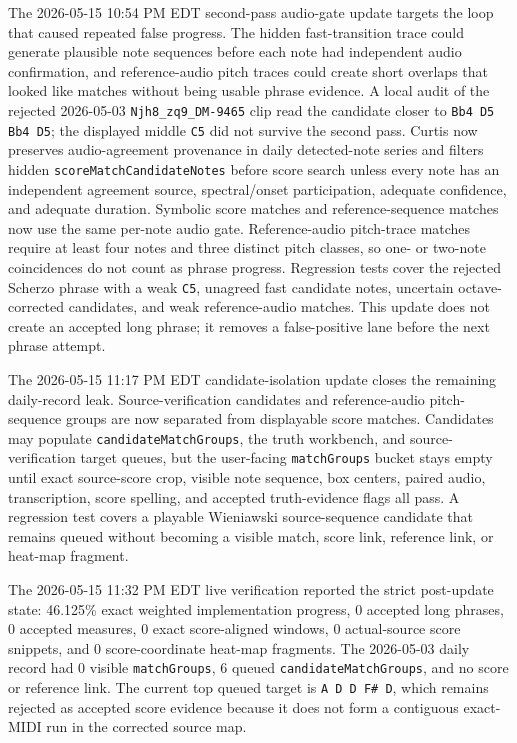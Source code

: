 \documentclass[12pt,letterpaper]{article}
\begin{document}
The 2026-05-15 10:54 PM EDT second-pass audio-gate update targets the loop that caused repeated false progress. The hidden fast-transition trace could generate plausible note sequences before each note had independent audio confirmation, and reference-audio pitch traces could create short overlaps that looked like matches without being usable phrase evidence. A local audit of the rejected 2026-05-03 \texttt{Njh8\_zq9\_DM-9465} clip read the candidate closer to \texttt{Bb4 D5 Bb4 D5}; the displayed middle \texttt{C5} did not survive the second pass. Curtis now preserves audio-agreement provenance in daily detected-note series and filters hidden \texttt{scoreMatchCandidateNotes} before score search unless every note has an independent agreement source, spectral/onset participation, adequate confidence, and adequate duration. Symbolic score matches and reference-sequence matches now use the same per-note audio gate. Reference-audio pitch-trace matches require at least four notes and three distinct pitch classes, so one- or two-note coincidences do not count as phrase progress. Regression tests cover the rejected Scherzo phrase with a weak \texttt{C5}, unagreed fast candidate notes, uncertain octave-corrected candidates, and weak reference-audio matches. This update does not create an accepted long phrase; it removes a false-positive lane before the next phrase attempt.

The 2026-05-15 11:17 PM EDT candidate-isolation update closes the remaining daily-record leak. Source-verification candidates and reference-audio pitch-sequence groups are now separated from displayable score matches. Candidates may populate \texttt{candidateMatchGroups}, the truth workbench, and source-verification target queues, but the user-facing \texttt{matchGroups} bucket stays empty until exact source-score crop, visible note sequence, box centers, paired audio, transcription, score spelling, and accepted truth-evidence flags all pass. A regression test covers a playable Wieniawski source-sequence candidate that remains queued without becoming a visible match, score link, reference link, or heat-map fragment.

The 2026-05-15 11:32 PM EDT live verification reported the strict post-update state: 46.125\% exact weighted implementation progress, 0 accepted long phrases, 0 accepted measures, 0 exact score-aligned windows, 0 actual-source score snippets, and 0 score-coordinate heat-map fragments. The 2026-05-03 daily record had 0 visible \texttt{matchGroups}, 6 queued \texttt{candidateMatchGroups}, and no score or reference link. The current top queued target is \texttt{A D D F\# D}, which remains rejected as accepted score evidence because it does not form a contiguous exact-MIDI run in the corrected source map.
\end{document}
